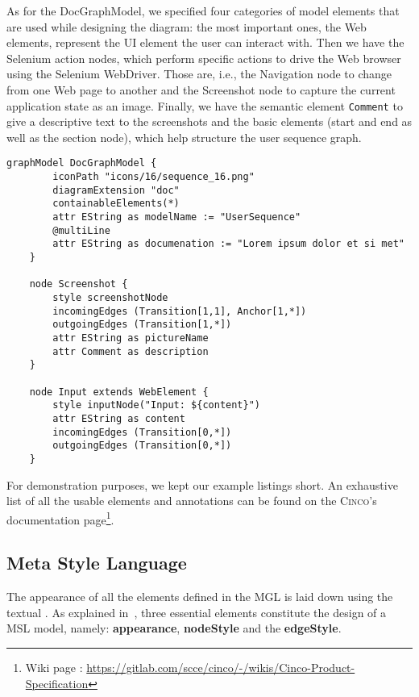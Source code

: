 As for the DocGraphModel, we specified four categories of model elements that are used while designing the diagram: the most important ones, the Web elements, represent the UI element the user can interact with. Then we have the Selenium action nodes, which perform specific actions to drive the Web browser using the Selenium WebDriver. Those are, i.e., the Navigation node to change from one Web page to another and the Screenshot node to capture the current application state as an image. Finally, we have the semantic element \lstinline{Comment} to give a descriptive text to the screenshots and the basic elements (start and end as well as the section node), which help structure the user sequence graph.

\begin{lstlisting}[language=MGL, caption={Excerpt from the Doc.mgl, meta-specification of the DocGraphModel}, label=featMGL, escapechar=|]
    graphModel DocGraphModel {
        iconPath "icons/16/sequence_16.png"
        diagramExtension "doc"
        containableElements(*)
        attr EString as modelName := "UserSequence"
        @multiLine
        attr EString as documenation := "Lorem ipsum dolor et si met"
    }
    
    node Screenshot {
        style screenshotNode
        incomingEdges (Transition[1,1], Anchor[1,*])
        outgoingEdges (Transition[1,*])
        attr EString as pictureName
        attr Comment as description
    }

    node Input extends WebElement {
        style inputNode("Input: ${content}")
        attr EString as content
        incomingEdges (Transition[0,*])
        outgoingEdges (Transition[0,*])
    }
\end{lstlisting}

For demonstration purposes, we kept our example listings short. An exhaustive list of all the usable elements and annotations can be found on the \textsc{Cinco}'s documentation page\footnote[1]{Wiki page : \url{https://gitlab.com/scce/cinco/-/wikis/Cinco-Product-Specification}}.

\subsection{Meta Style Language}\label{sec:MSL}

The appearance of all the elements defined in the MGL is laid down using the textual . As explained in~\cite{gitlabcinco}, three essential elements constitute the design of a MSL model, namely: \textbf{appearance}, \textbf{nodeStyle} and the \textbf{edgeStyle}.

